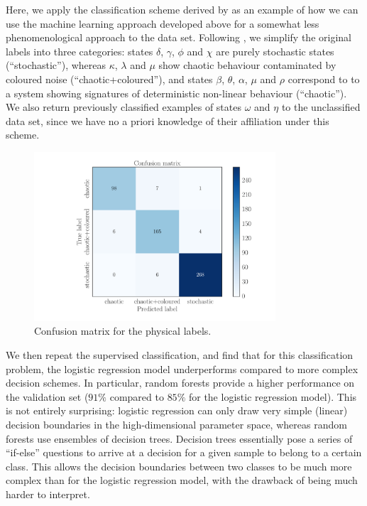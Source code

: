 \documentclass[fleqn,usenatbib]{mnras}
\begin{document}
Here, we apply the classification scheme derived by \citet{harikrishnan2011} as an example of how we can use the machine learning approach developed above 
for a somewhat less phenomenological approach to the data set. 
Following \citet{harikrishnan2011}, we simplify the original labels into three categories: states $\delta$, $\gamma$, $\phi$ and $\chi$ are purely stochastic states
(``stochastic''), whereas $\kappa$, $\lambda$ and $\mu$ show chaotic behaviour contaminated by coloured noise (``chaotic+coloured''), and states $\beta$, $\theta$, $\alpha$, $\mu$ and $\rho$ correspond to to a system showing signatures of deterministic non-linear behaviour (``chaotic'').
We also return previously classified examples of states $\omega$ and $\eta$ to the unclassified data set, since we have no a priori knowledge of their affiliation under this scheme.
\begin{figure}
\begin{center}
\includegraphics[width=9cm]{grs1915_supervised_phys_cm.pdf}
\caption{Confusion matrix for the physical labels.} 
\label{fig:confusionmatrix_physical}
\end{center}
\end{figure}
We then repeat the supervised classification, and find that for this classification problem, the logistic regression model underperforms compared to more complex decision schemes. In particular, random forests provide a higher performance on the validation set ($91\%$ compared to $85\%$ for the logistic regression model). 
This is not entirely surprising: logistic regression can only draw very simple (linear) decision boundaries in the high-dimensional parameter space, whereas random forests use ensembles of decision trees. Decision trees essentially pose a series of ``if-else'' questions to arrive at a decision for a given sample to belong to a certain class. This allows the decision boundaries between two classes to be much more complex than for the logistic regression model, with the drawback of being much harder to interpret.
\end{document}

